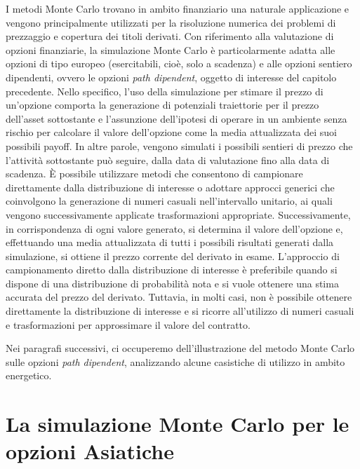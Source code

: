\documentclass[12pt,a4paper]{report}
\begin{document}
I metodi Monte Carlo trovano in ambito finanziario una naturale applicazione e vengono principalmente utilizzati per la risoluzione numerica dei problemi di prezzaggio e copertura dei titoli derivati. Con riferimento alla valutazione di opzioni finanziarie, la simulazione Monte Carlo è particolarmente adatta alle opzioni di tipo europeo (esercitabili, cioè, solo a scadenza) e alle opzioni sentiero dipendenti, ovvero le opzioni \textit{path dipendent}, oggetto di interesse del capitolo precedente. Nello specifico, l'uso della simulazione per stimare il prezzo di un'opzione comporta la generazione di potenziali traiettorie per il prezzo dell'asset sottostante e l'assunzione dell'ipotesi di operare in un ambiente senza rischio per calcolare il valore dell'opzione come la media attualizzata dei suoi possibili payoff. In altre parole, vengono simulati i possibili sentieri di prezzo che l'attività sottostante può seguire, dalla data di valutazione fino alla data di scadenza. 
È possibile utilizzare metodi che consentono di campionare direttamente dalla distribuzione di interesse o adottare approcci generici che coinvolgono la generazione di numeri casuali nell'intervallo unitario, ai quali vengono successivamente applicate trasformazioni appropriate. Successivamente, in corrispondenza di ogni valore generato, si determina il valore dell'opzione e, effettuando una media attualizzata di tutti i possibili risultati generati dalla simulazione, si ottiene il prezzo corrente del derivato in esame.  L'approccio di campionamento diretto dalla distribuzione di interesse è preferibile quando si dispone di una distribuzione di probabilità nota e si vuole ottenere una stima accurata del prezzo del derivato. Tuttavia, in molti casi, non è possibile ottenere direttamente la distribuzione di interesse e si ricorre all'utilizzo di numeri casuali e trasformazioni per approssimare il valore del contratto.

Nei paragrafi successivi, ci occuperemo dell'illustrazione del metodo Monte Carlo sulle opzioni \textit{path dipendent}, analizzando alcune casistiche di utilizzo in ambito energetico.


\section{La simulazione Monte Carlo per le opzioni Asiatiche}
\end{document}
